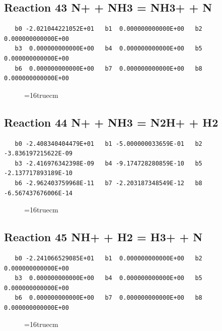 \documentclass[12pt,dvipdfm]{article}
\begin{document}
\subsection{
Reaction 43 N+ + NH3 = NH3+ + N }
\begin{small}\begin{verbatim}
   b0 -2.021044221052E+01   b1  0.000000000000E+00   b2  0.000000000000E+00
   b3  0.000000000000E+00   b4  0.000000000000E+00   b5  0.000000000000E+00
   b6  0.000000000000E+00   b7  0.000000000000E+00   b8  0.000000000000E+00
\end{verbatim}\end{small}
\begin{figure}[h!] \label{n2rates}
\epsfxsize=16truecm
\end{figure}
\newpage

\subsection{
Reaction 44 N+ + NH3 = N2H+ + H2 }
\begin{small}\begin{verbatim}
   b0 -2.408340404479E+01   b1 -5.000000033659E-01   b2 -3.836197215622E-09
   b3 -2.416976342398E-09   b4 -9.174728280859E-10   b5 -2.137717893189E-10
   b6 -2.962403759968E-11   b7 -2.203187348549E-12   b8 -6.567437676006E-14
\end{verbatim}\end{small}
\begin{figure}[h!] \label{n2rates}
\epsfxsize=16truecm
\end{figure}
\newpage

\subsection{
Reaction 45 NH+ + H2 = H3+ + N }
\begin{small}\begin{verbatim}
   b0 -2.241066529085E+01   b1  0.000000000000E+00   b2  0.000000000000E+00
   b3  0.000000000000E+00   b4  0.000000000000E+00   b5  0.000000000000E+00
   b6  0.000000000000E+00   b7  0.000000000000E+00   b8  0.000000000000E+00
\end{verbatim}\end{small}
\begin{figure}[h!] \label{n2rates}
\epsfxsize=16truecm
\end{figure}
\newpage
\end{document}
